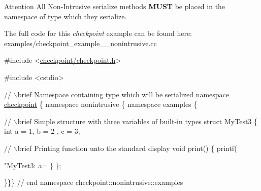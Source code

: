 \begin{DoxyAttention}{Attention}
All Non-\/\+Intrusive serialize methods {\bfseries M\+U\+ST} be placed in the namespace of type which they serialize.
\end{DoxyAttention}
The full code for this {\itshape checkpoint} example can be found here\+: {\ttfamily examples/checkpoint\+\_\+example\+\_\+\_\+nonintrusive.\+cc}


\begin{DoxyCodeInclude}

\textcolor{preprocessor}{#include <\hyperlink{checkpoint_8h}{checkpoint/checkpoint.h}>}

\textcolor{preprocessor}{#include <cstdio>}

\textcolor{comment}{// \(\backslash\)brief Namespace containing type which will be serialized}
\textcolor{keyword}{namespace }\hyperlink{namespacecheckpoint}{checkpoint} \{ \textcolor{keyword}{namespace }nonintrusive \{ \textcolor{keyword}{namespace }examples \{

\textcolor{comment}{// \(\backslash\)brief Simple structure with three variables of built-in types}
\textcolor{keyword}{struct }MyTest3 \{
  \textcolor{keywordtype}{int} a = 1, b = 2 , c = 3;

  \textcolor{comment}{// \(\backslash\)brief Printing function unto the standard display}
  \textcolor{keywordtype}{void} print() \{
    printf(\textcolor{stringliteral}{"MyTest3: a=%
  \}
\};

\}\}\} \textcolor{comment}{// end namespace checkpoint::nonintrusive::examples}

}
\end{DoxyCodeInclude}
